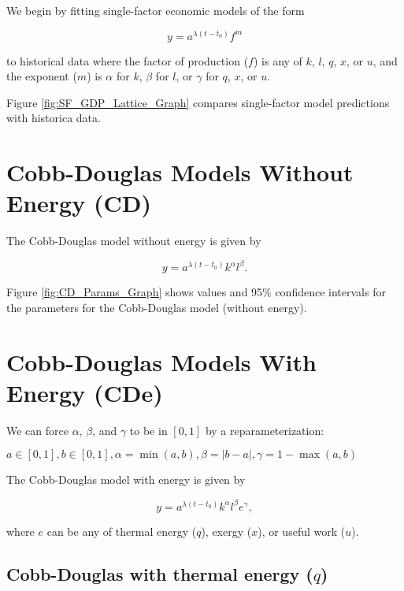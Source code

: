 \documentclass[preprint,authoryear,12pt]{elsarticle}\usepackage{graphicx, color}
\begin{document}
We begin by fitting single-factor economic models of the form

\begin{equation} \label{eq:Single_Factor_Generic}
  y = a^{\lambda (t-t_0)}f^{m}
\end{equation}

\noindent to historical data where the factor of production ($f$) is any of $k$, $l$, $q$, $x$, or $u$, and the exponent ($m$) is $\alpha$ for $k$, $\beta$ for $l$, or $\gamma$ for $q$, $x$, or $u$.

Figure \ref{fig:SF_GDP_Lattice_Graph} compares single-factor model predictions with historica data.




\section{Cobb-Douglas Models Without Energy (CD)}




The Cobb-Douglas model without energy is given by

\begin{equation} \label{eq:CD_No_Energy}
  y = a^{\lambda (t-t_0)}k^{\alpha}l^{\beta}.
\end{equation}

Figure \ref{fig:CD_Params_Graph} shows values and 95\% confidence intervals for the parameters for the Cobb-Douglas model (without energy).




\section{Cobb-Douglas Models With Energy (CDe)}

We can force $\alpha$, $\beta$, and $\gamma$ to be in $[0,1]$ by a reparameterization:

$a \in[0,1], b \in [0,1], \alpha=\min(a,b), \beta=|b-a|, \gamma = 1-\max(a,b)$

The Cobb-Douglas model with energy is given by

\begin{equation} \label{eq:CD_With_Energy}
  y = a^{\lambda (t-t_0)}k^{\alpha}l^{\beta}e^{\gamma},
\end{equation}

\noindent where $e$ can be any of thermal energy ($q$), exergy ($x$), or useful work ($u$).

\subsection{Cobb-Douglas with thermal energy ($q$)}
\end{document}
